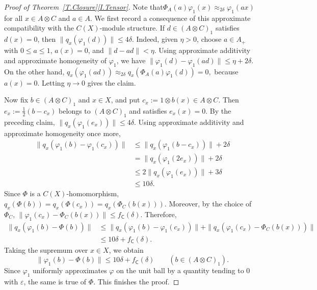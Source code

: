 \documentclass[10pt,a4paper]{amsart}
\newcommand{\sfC}{\mathsf C}
\begin{document}
\begin{proof}[Proof of Theorem~\ref{T.Closure}\eqref{I.Tensor}]
	Note that$\Phi_A(a)\varphi_1(x) \approx_{2\delta} \varphi_1(ax)$ for all $x \in A \otimes C$ and $a \in A$.
	We first record a consequence of this approximate compatibility with the $C(X)$-module structure.
	If $d\in (A\otimes C)_1$ satisfies $d(x)=0$, then
	$
		\|q_x(\varphi_1(d))\|\leq 4\delta.
	$
	Indeed, given $\eta>0$, choose $a\in A_+$ with
	$0\leq a\leq 1$, $a(x)=0$, and $\|d-ad\|<\eta$.
	Using approximate additivity and approximate homogeneity of
	$\varphi_1$, we have
	$
		\|\varphi_1(d)-\varphi_1(ad)\|
		\leq \eta+2\delta.
	$
	On the other hand,
	$
		q_x(\varphi_1(ad))
		\approx_{2\delta}q_x(\Phi_A(a)\varphi_1(d))=0,
	$
	because $a(x)=0$. Letting $\eta\to 0$ gives the claim.

	Now fix $b\in (A\otimes C)_1$ and $x\in X$, and put
	$
		c_x:=1\otimes b(x)\in A\otimes C.
	$
	Then $e_x:=\frac12(b-c_x)$ belongs to $(A\otimes C)_1$ and satisfies
	$e_x(x)=0$. By the preceding claim,
	$
		\|q_x(\varphi_1(e_x))\|\leq 4\delta.
	$
	Using approximate additivity and approximate homogeneity once more,
	\begin{align*}
		\|q_x(\varphi_1(b)-\varphi_1(c_x))\|
		&\leq \|q_x(\varphi_1(b-c_x))\|+2\delta\\
		&=\|q_x(\varphi_1(2e_x))\|+2\delta\\
		&\leq 2\|q_x(\varphi_1(e_x))\|+3\delta\\
		&\leq 10\delta.
	\end{align*}
	Since $\Phi$ is a $C(X)$-homomorphism,
	$
		q_x(\Phi(b))=q_x(\Phi(c_x))
		=q_x(\Phi_C(b(x))).
	$
	Moreover, by the choice of $\Phi_C$,
	$
		\|\varphi_1(c_x)-\Phi_C(b(x))\|
		\leq f_{\sfC}(\delta).
	$
	Therefore,
	\begin{align*}
		\|q_x(\varphi_1(b)-\Phi(b))\|
		&\leq
		\|q_x(\varphi_1(b)-\varphi_1(c_x))\|
		+\|q_x(\varphi_1(c_x)-\Phi_C(b(x)))\|\\
		&\leq 10\delta+f_{\sfC}(\delta).
	\end{align*}
	Taking the supremum over $x\in X$, we obtain
	\[
		\|\varphi_1(b)-\Phi(b)\|
		\leq 10\delta+f_{\sfC}(\delta)
		\qquad (b\in (A\otimes C)_1).
	\]
	Since $\varphi_1$ uniformly approximates $\varphi$ on the unit ball
	by a quantity tending to $0$ with $\varepsilon$, the same is true of
	$\Phi$. This finishes the proof.
\end{proof}
\end{document}
